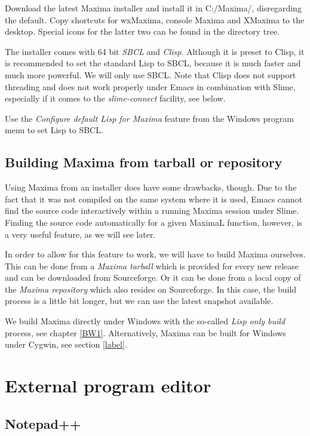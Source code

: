 \documentclass[../Maxima_Workbook.tex]{subfiles}
\begin{document}
\lz Download the latest Maxima installer and install it in C:/Maxima/, disregarding the default. Copy shortcuts for wxMaxima, console Maxima and XMaxima to the desktop. Special icons for the latter two can be found in the directory tree.

\lz The installer comes with 64 bit \emph{SBCL} and \emph{Clisp}. Although it is preset to Clisp, it is recommended to set the standard Lisp to SBCL, because it is much faster and much more powerful. We will only use SBCL. Note that Clisp does not support threading and does not work properly under Emacs in combination with Slime, especially if it comes to the \emph{slime-connect} facility, see below.

\lz Use the \emph{Configure default Lisp for Maxima} feature from the Windows program menu to set Lisp to SBCL.

\subsection{Building Maxima from tarball or repository}

Using Maxima from an installer does have some drawbacks, though. Due to the fact that it was not compiled on the same system where it is used, Emacs cannot find the source code interactively within a running Maxima session under Slime. Finding the source code automatically for a given MaximaL function, however, is a very useful feature, as we will see later.

\lz In order to allow for this feature to work, we will have to build Maxima ourselves. This can be done from a \emph{Maxima tarball} which is provided for every new release and can be downloaded from Sourceforge. Or it can be done from a local copy of the \emph{Maxima repository} which also resides on Sourceforge. In this case, the build process is a little bit longer, but we can use the latest snapshot available.

\lz We build Maxima directly under Windows with the so-called \emph{Lisp only build} process, see chapter \ref{BW1}. Alternatively, Maxima can be built for Windows under Cygwin, see section \ref{label}.

\section{External program editor}

\subsection{Notepad++}
\end{document}
